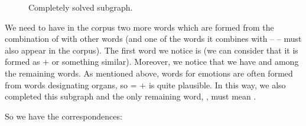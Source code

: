 \begin{refsection}
\begin{mysolution}
\begin{figure}
\caption{Completely solved subgraph.}
\label{fig:Guarani-step6}
\end{figure}

We need to have in the corpus two more words which are formed from the combination of  with other words (and one of the words it combines with --  -- must also appear in the corpus). The first word we notice is  (we can consider that it is formed as  $+$  or something similar). Moreover, we notice that we have  and  among the remaining words. As mentioned above, words for emotions are often formed from words designating organs, so  =  $+$  is quite plausible. In this way, we also completed this subgraph and the only remaining word, , must mean .

So we have the correspondences:



\end{mysolution}
\end{refsection}
